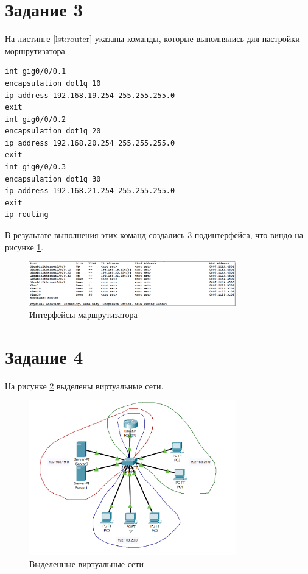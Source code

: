 \section{Задание 3}

На листинге \ref{lst:router} указаны команды, которые выполнялись для настройки моршрутизатора.

\begin{lstlisting}[frame=single,caption=Команды для настройки маршрутизатора,label=lst:router]
int gig0/0/0.1
encapsulation dot1q 10
ip address 192.168.19.254 255.255.255.0
exit
int gig0/0/0.2
encapsulation dot1q 20
ip address 192.168.20.254 255.255.255.0
exit
int gig0/0/0.3
encapsulation dot1q 30
ip address 192.168.21.254 255.255.255.0
exit
ip routing
\end{lstlisting}

В результате выполнения этих команд создались 3 подинтерфейса, что виндо на рисунке \ref{fig:ports_router}.

\begin{figure}[H]
    \centering
    \includegraphics[width=0.8\textwidth]{img/content/ports_router.png}
    \caption{Интерфейсы маршрутизатора}
    \label{fig:ports_router}
\end{figure}

\section{Задание 4}

На рисунке \ref{fig:virt} выделены виртуальные сети.

\begin{figure}[H]
    \centering
    \includegraphics[width=0.8\textwidth]{img/content/stand_virt.png}
    \caption{Выделенные виртуальные сети}
    \label{fig:virt}
\end{figure}

